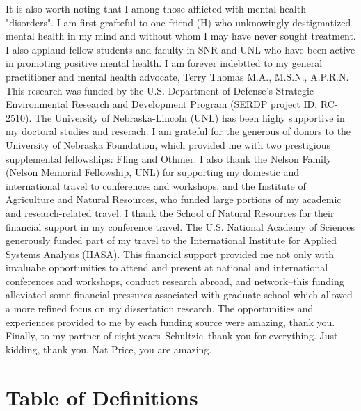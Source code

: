 \documentclass[print]{nuthesis}
\begin{document}
\begin{acknowledgments}
It is also worth noting that I among those afflicted with mental health "disorders". I am first grafteful to one friend (H) who unknowingly destigmatized mental health in my mind and without whom I may have never sought treatment. I also applaud fellow students and faculty in SNR and UNL who have been active in promoting positive mental health. I am forever  indebtted to my general practitioner and mental health advocate, Terry Thomas M.A., M.S.N., A.P.R.N.
This research was funded by the U.S. Department of Defense’s Strategic Environmental Research and Development Program (SERDP project ID: RC-2510). The University of Nebraska-Lincoln (UNL) has been highy supportive in my doctoral studies and reserach. I am grateful for the generous of donors to the University of Nebraska Foundation, which provided me with two prestigious supplemental fellowships: Fling and Othmer. I also thank the Nelson Family (Nelson Memorial Fellowship, UNL) for supporting my domestic and international travel to conferences and workshops, and the Institute of Agriculture and Natural Resources, who funded large portions of my academic and research-related travel. I thank the School of Natural Resources for their financial support in my conference travel. The U.S. National Academy of Sciences generously funded part of my travel to the International Institute for Applied Systems Analysis (IIASA). This financial support provided me not only with invaluabe opportunities to attend and present at national and international conferences and workshops, conduct research abroad, and network--this funding alleviated some financial pressures associated with graduate school which allowed a more refined focus on my dissertation research. The opportunities and experiences provided to me by each funding source were amazing, thank you. 
Finally, to my partner of eight years--Schultzie--thank you for everything. Just kidding, thank you, Nat Price, you are amazing.
 \end{acknowledgments}


\tableofcontents

  \listoftables

  \listoffigures

\mainmatter

\hypertarget{definitions}{%
\chapter*{Table of Definitions}\label{definitions}}
\end{document}
